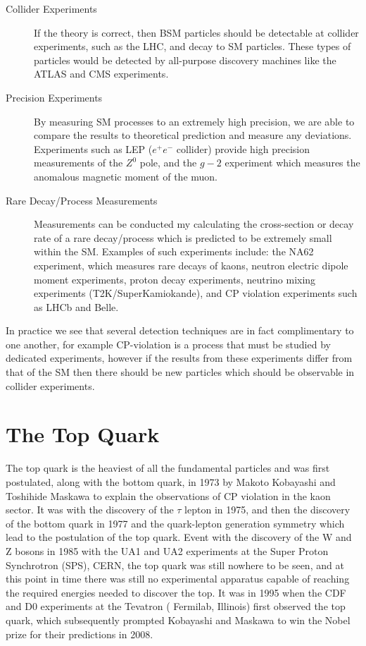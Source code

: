\begin{description}
	\item[Collider Experiments] If the theory is correct, then BSM particles should be detectable at collider experiments, such as the LHC, and decay to SM particles. These types of particles would be detected by all-purpose discovery machines like the ATLAS and CMS experiments.
	\item[Precision Experiments] By measuring SM processes to an extremely high precision, we are able to compare the results to theoretical prediction and measure any deviations. Experiments such as LEP ($e^+e^-$ collider) provide high precision measurements of the $Z^0$ pole, and the $g - 2$ experiment which measures the anomalous magnetic moment of the muon.
	\item[Rare Decay/Process Measurements] Measurements can be conducted my calculating the cross-section or decay rate of a rare decay/process which is predicted to be extremely small within the SM. Examples of such experiments include: the NA62 experiment, which measures rare decays of kaons, neutron electric dipole moment experiments, proton decay experiments, neutrino mixing experiments (T2K/SuperKamiokande), and CP violation experiments such as LHCb and Belle. 
\end{description}

In practice we see that several detection techniques are in fact complimentary to one another, for example CP-violation is a process that must be studied by dedicated experiments, however if the results from these experiments differ from that of the SM then there should be new particles which should be observable in collider experiments. 

\section{The Top Quark} \label{sec-TheTopQuark}

The top quark is the heaviest of all the fundamental particles and was first postulated, along with the bottom quark, in 1973 by Makoto 
Kobayashi and Toshihide Maskawa \cite{Kobayashi:1973fv} to explain the observations of CP violation in the kaon sector. It was with the 
discovery of the $\tau$ lepton \cite{PhysRevLett.35.1489} in 1975, and then the discovery of the bottom quark in 1977 \cite{Innes:1977ae} and 
the quark-lepton generation symmetry which lead to the postulation of the top quark. Event with the discovery of the W and Z bosons in 1985 
with the UA1 \cite{ARNISON1983103} and UA2 \cite{Banner1983476} experiments at the Super Proton Synchrotron (SPS), CERN, the top quark was 
still nowhere to be seen, and at this point in time there was still no experimental apparatus capable of reaching the required energies needed 
to discover the top. It was in 1995 when the CDF \cite{PhysRevLett.74.2626} and D0 \cite{PhysRevLett.74.2422} experiments at the Tevatron (
Fermilab, Illinois) first observed the top quark, which subsequently prompted Kobayashi and Maskawa to win the Nobel prize for their 
predictions in 2008.

